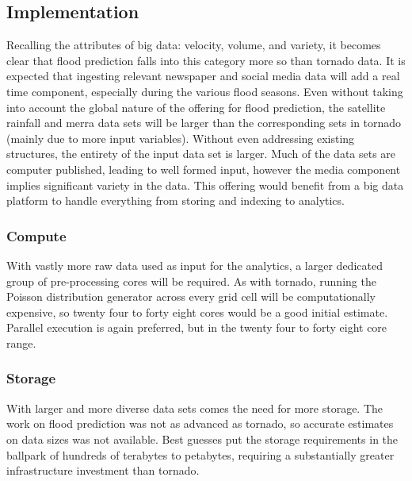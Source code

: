 \subsection{Implementation}
Recalling the attributes of big data: velocity, volume, and variety, it becomes clear that flood prediction falls into this category more so than tornado data. It is expected that ingesting relevant newspaper and social media data will add a real time component, especially during the various flood seasons. Even without taking into account the global nature of the offering for flood prediction, the satellite rainfall and \gls{merra} data sets will be larger than the corresponding sets in tornado (mainly due to more input variables). Without even addressing existing structures, the entirety of the input data set is larger. Much of the data sets are computer published, leading to well formed input, however the media component implies significant variety in the data.  This offering would benefit from a big data platform to handle everything from storing and indexing to analytics.
\subsubsection{Compute}
 With vastly more raw data used as input for the analytics, a larger dedicated group of pre-processing cores will be required. As with tornado, running the Poisson distribution generator across every grid cell will be computationally expensive, so twenty four to forty eight cores would be a good initial estimate. Parallel execution is again preferred, but in the twenty four to forty eight core range. 
\subsubsection{Storage}
With larger and more diverse data sets comes the need for more storage. The work on flood prediction was not as advanced as tornado, so accurate estimates on data sizes was not available. Best guesses put the storage requirements in the ballpark of hundreds of terabytes to petabytes, requiring a substantially greater infrastructure investment than tornado.


